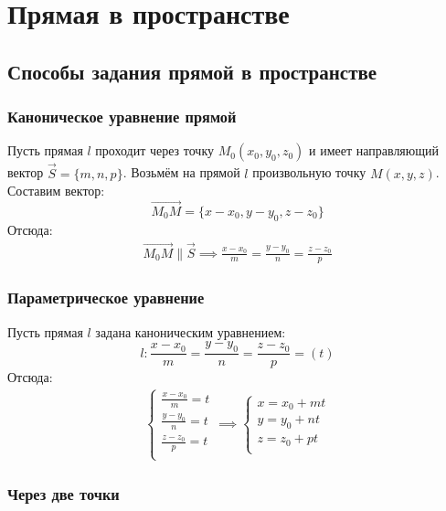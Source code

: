 \section{Прямая в пространстве}

\subsection{Способы задания прямой в пространстве}

\subsubsection{Каноническое уравнение прямой}

Пусть прямая $l$ проходит через точку $M_0\left(x_0, y_0, z_0 \right)$ и имеет направляющий вектор $\vec{S} = \{m, n, p\}$.
Возьмём на прямой $l$ произвольную точку $M(x, y, z)$.
Составим вектор: \[
\overrightarrow{M_0M} = \{x - x_0, y - y_0, z - z_0\} 
\] 
Отсюда:
\begin{gather*}
  \overrightarrow{M_0M} \parallel \vec{S} \implies \boxed{\frac{x - x_0}{m} = \frac{y - y_0}{n} = \frac{z - z_0}{p}}
\end{gather*}

\subsubsection{Параметрическое уравнение}

Пусть прямая $l$ задана каноническим уравнением:  \[
l: \frac{x - x_0}{m} = \frac{y - y_0}{n} = \frac{z - z_0}{p} = (t)
\] 
Отсюда:
\begin{gather*}
  \begin{cases}
  \frac{x - x_0}{m} = t \\
  \frac{y - y_0}{n} = t \\
  \frac{z - z_0}{p} = t \\
  \end{cases} \implies \boxed{
  \begin{cases}
    x = x_0 + mt \\
    y = y_0 + nt \\
    z = z_0 + pt \\
  \end{cases}}
\end{gather*}

\subsubsection{Через две точки}

